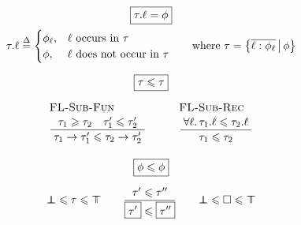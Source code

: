 $$ 
\begin{array}{c}
\boxed{\flproj{\tau}{\ell} = \phi}
\\[0.5em]
\flproj{\tau}{\ell} \defeq \begin{cases}
    \phi_\ell, & \ell \text{ occurs in } \tau \\
    \phi, & \ell \text{ does not occur in } \tau
\end{cases} \qquad \text{where } \tau = \flext{ \overline{\ell : \phi_\ell}}{\phi}
\\[1.5em]
\boxed{\tau \sub \tau}
\\[0.5em]
\irule{FL-Sub-Fun}{\tau_1 \super \tau_2 \quad \tau_1' \sub \tau_2'}{\tau_1 \to \tau_1' \sub \tau_2 \to \tau_2'}
\qquad
\irule{FL-Sub-Rec}{\forall \ell \ldotp \flproj{\tau_1}{\ell} \sub \flproj{\tau_2}{\ell}}{\tau_1 \sub \tau_2}
\\[2.5em]
\boxed{\phi \sub \phi}
\\[1em]
\flfbot \sub \tau \sub \flftop \qquad \dfrac{\tau' \sub \tau''}{\flpresent {\tau'} \sub \flpresent {\tau''}} \qquad \flfbot \sub \flabsent \sub \flftop
\end{array} 
$$